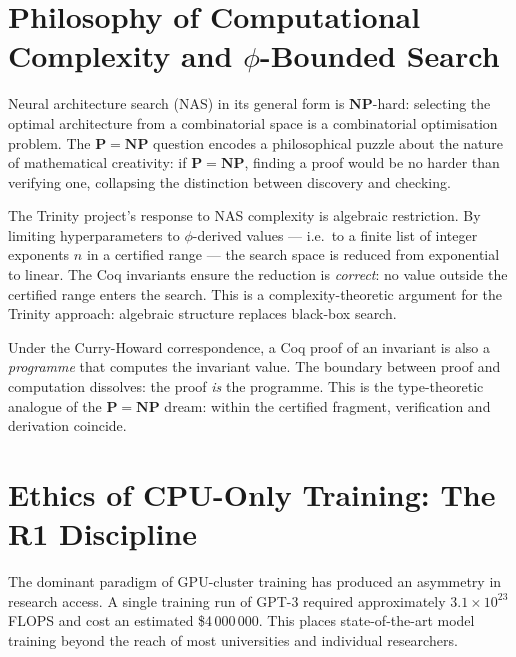 \section{Philosophy of Computational Complexity and \(\phi\)-Bounded Search}
\label{sec:phd31-complexity}

Neural architecture search (NAS) in its general form is \(\mathbf{NP}\)-hard:
selecting the optimal architecture from a combinatorial space is a combinatorial
optimisation problem.  The \(\mathbf{P} = \mathbf{NP}\) question encodes a
philosophical puzzle about the nature of mathematical creativity: if
\(\mathbf{P} = \mathbf{NP}\), finding a proof would be no harder than verifying
one, collapsing the distinction between discovery and checking.

The Trinity project's response to NAS complexity is algebraic restriction.
By limiting hyperparameters to \(\phi\)-derived values — i.e.\ to a finite
list of integer exponents \(n\) in a certified range — the search space is
reduced from exponential to linear.  The Coq invariants ensure the reduction
is \emph{correct}: no value outside the certified range enters the search.
This is a complexity-theoretic argument for the Trinity approach: algebraic
structure replaces black-box search.

Under the Curry-Howard correspondence, a Coq proof of an invariant is also
a \emph{programme} that computes the invariant value.  The boundary between
proof and computation dissolves: the proof \emph{is} the programme.  This is
the type-theoretic analogue of the \(\mathbf{P} = \mathbf{NP}\) dream:
within the certified fragment, verification and derivation coincide.

\section{Ethics of CPU-Only Training: The R1 Discipline}
\label{sec:phd31-ethics-r1}

The dominant paradigm of GPU-cluster training has produced an asymmetry in
research access.  A single training run of GPT-3 required approximately
\(3.1 \times 10^{23}\) FLOPS and cost an estimated \$4\,000\,000.  This
places state-of-the-art model training beyond the reach of most universities
and individual researchers.


